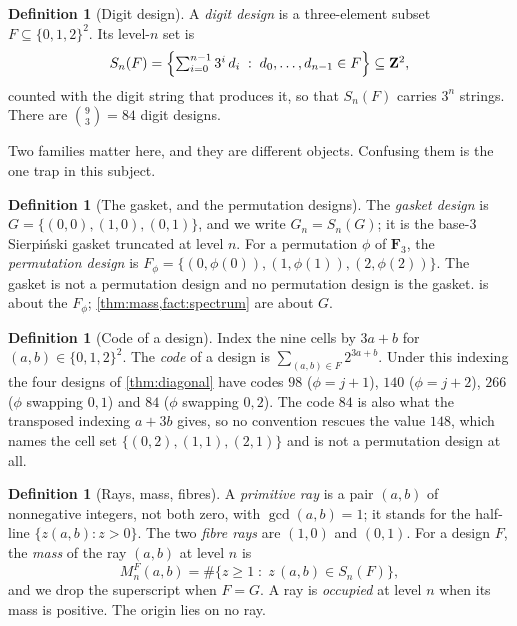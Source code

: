 \documentclass[11pt]{amsart}
\theoremstyle{definition}
\newtheorem{definition}[theorem]{Definition}
\theoremstyle{remark}
\begin{document}
\begin{definition}[Digit design]
\label{def:design}
A \emph{digit design} is a three-element subset $F\subseteq\{0,1,2\}^2$. Its level-$n$ set is
\[
S_n(F)=\Bigl\{\textstyle\sum_{i=0}^{n-1} 3^i\, d_i \;:\; d_0,\dots,d_{n-1}\in F\Bigr\}\subseteq \mathbf{Z}^2 ,
\]
counted with the digit string that produces it, so that $S_n(F)$ carries $3^n$ strings. There are $\binom{9}{3}=84$ digit designs.
\end{definition}

Two families matter here, and they are different objects. Confusing them is the one trap in this subject.

\begin{definition}[The gasket, and the permutation designs]
\label{def:two}
The \emph{gasket design} is $G=\{(0,0),(1,0),(0,1)\}$, and we write $G_n=S_n(G)$; it is the base-$3$ Sierpi\'nski gasket truncated at level $n$. For a permutation $\phi$ of $\mathbf{F}_3$, the \emph{permutation design} is $F_\phi=\{(0,\phi(0)),(1,\phi(1)),(2,\phi(2))\}$. The gasket is not a permutation design and no permutation design is the gasket.  is about the $F_\phi$; \cref{thm:mass,fact:spectrum} are about $G$.
\end{definition}

\begin{definition}[Code of a design]
\label{def:code}
Index the nine cells by $3a+b$ for $(a,b)\in\{0,1,2\}^2$. The \emph{code} of a design is $\sum_{(a,b)\in F} 2^{3a+b}$. Under this indexing the four designs of \cref{thm:diagonal} have codes $98$ ($\phi=j+1$), $140$ ($\phi=j+2$), $266$ ($\phi$ swapping $0,1$) and $84$ ($\phi$ swapping $0,2$). The code $84$ is also what the transposed indexing $a+3b$ gives, so no convention rescues the value $148$, which names the cell set $\{(0,2),(1,1),(2,1)\}$ and is not a permutation design at all.
\end{definition}

\begin{definition}[Rays, mass, fibres]
\label{def:ray}
A \emph{primitive ray} is a pair $(a,b)$ of nonnegative integers, not both zero, with $\gcd(a,b)=1$; it stands for the half-line $\{z(a,b):z>0\}$. The two \emph{fibre rays} are $(1,0)$ and $(0,1)$. For a design $F$, the \emph{mass} of the ray $(a,b)$ at level $n$ is
\[
M_n^F(a,b)=\#\{z\ge 1 \;:\; z\,(a,b)\in S_n(F)\},
\]
and we drop the superscript when $F=G$. A ray is \emph{occupied} at level $n$ when its mass is positive. The origin lies on no ray.
\end{definition}
\end{document}
